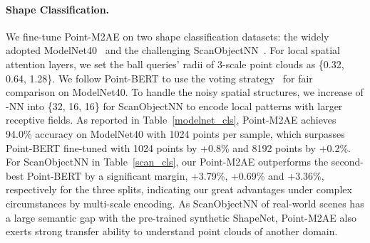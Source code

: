 \documentclass{article}
\begin{document}
\paragraph{Shape Classification.}
We fine-tune Point-M2AE on two shape classification datasets: the widely adopted ModelNet40~\cite{modelnet40} and the challenging ScanObjectNN~\cite{scanobjectnn}.
For local spatial attention layers, we set the ball queries' radii of 3-scale point clouds as \{0.32, 0.64, 1.28\}.
We follow Point-BERT to use the voting strategy~\cite{rscnn} for fair comparison on ModelNet40. To handle the noisy spatial structures, we increase  of -NN into \{32, 16, 16\} for ScanObjectNN to encode local patterns with larger receptive fields. 
As reported in Table~\ref{modelnet_cls}, Point-M2AE achieves 94.0\% accuracy on ModelNet40 with 1024 points per sample, which surpasses Point-BERT fine-tuned with 1024 points by +0.8\% and 8192 points by +0.2\%. For ScanObjectNN in Table~\ref{scan_cls}, our Point-M2AE outperforms the second-best Point-BERT by a significant margin, +3.79\%, +0.69\% and +3.36\%, respectively for the three splits, indicating our great advantages under complex circumstances by multi-scale encoding. As ScanObjectNN of real-world scenes has a large semantic gap with the pre-trained synthetic ShapeNet, Point-M2AE also exerts strong transfer ability to understand point clouds of another domain.
\end{document}
